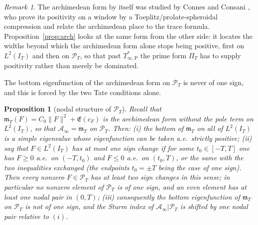 \documentclass[11pt]{amsart}
\newtheorem{proposition}[theorem]{Proposition}
\theoremstyle{definition}
\theoremstyle{remark}
\newtheorem{remark}[theorem]{Remark}
\newcommand{\PT}{\mathcal P_T}
\newcommand{\IT}{I_T}
\newcommand{\cF}{c_F}
\newcommand{\Lev}{\mathfrak E}
\newcommand{\Ainf}{\mathcal A_\infty}
\newcommand{\PiT}{\Pi_T}
\newcommand{\mT}{\mathfrak m_T}
\begin{document}
\begin{remark}
The archimedean form by itself was studied by Connes and Consani \cite{ConnesConsani2021}, who prove
its positivity on a window by a Toeplitz/prolate-spheroidal compression and relate the archimedean
place to the trace formula. Proposition~\ref{prop:arch} looks at the same form from the other side:
it locates the widths beyond which the archimedean form alone stops being positive, first on
$L^2(I_T)$ and then on $\PT$, so that past $T^*_{\infty,\mathrm P}$ the prime form $\PiT$ has to
supply positivity rather than merely be dominated.
\end{remark}

The bottom eigenfunction of the archimedean form on $\PT$ is never of one sign, and this is forced
by the two Tate conditions alone.

\begin{proposition}[nodal structure of $\PT$]\label{prop:nodes}
Recall that $\mT(F)=C_0\|F\|^2+\Lev(\cF)$ is the archimedean form without the pole term on
$L^2(\IT)$, so that $\Ainf=\mT$ on $\PT$. Then:
\emph{(i)} the bottom of $\mT$ on all of $L^2(\IT)$ is a simple eigenvalue whose
eigenfunction can be taken a.e.\ strictly positive;
\emph{(ii)} say that $F\in L^2(\IT)$ has \emph{at most one sign change} if for some
$t_0\in[-T,T]$ one has $F\ge0$ a.e.\ on $(-T,t_0)$ and $F\le0$ a.e.\ on $(t_0,T)$, or the same
with the two inequalities exchanged (the endpoints $t_0=\pm T$ being the case of one sign).
Then every nonzero $F\in\PT$ has at least two sign changes in this sense; in particular no
nonzero element of $\PT$ is of one sign, and an even element has at least one nodal pair in
$(0,T)$;
\emph{(iii)} consequently the bottom eigenfunction of $\mT$ on $\PT$ is not of one sign,
and the Sturm index of $\Ainf|\PT$ is shifted by one nodal pair relative to $(i)$.
\end{proposition}
\end{document}
